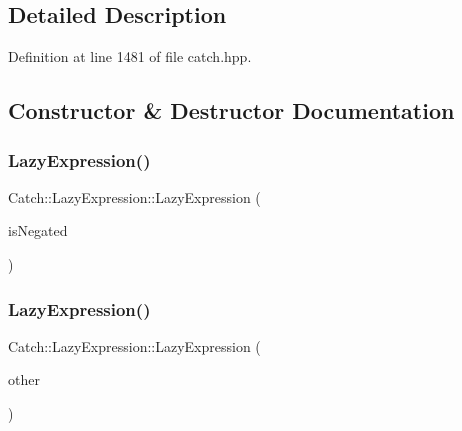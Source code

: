 \subsection{Detailed Description}


Definition at line 1481 of file catch.\+hpp.



\subsection{Constructor \& Destructor Documentation}
\mbox{\label{class_catch_1_1_lazy_expression_a47186c2487bd4bf871e870ba8048553a}} 
\subsubsection{\texorpdfstring{Lazy\+Expression()}{LazyExpression()}\hspace{0.1cm}{\footnotesize\ttfamily [1/2]}}
{\footnotesize\ttfamily Catch\+::\+Lazy\+Expression\+::\+Lazy\+Expression (\begin{DoxyParamCaption}\item[{bool}]{is\+Negated }\end{DoxyParamCaption})}

\mbox{\label{class_catch_1_1_lazy_expression_ab82d5e94df0e159b018fbde0170e46f8}} 
\subsubsection{\texorpdfstring{Lazy\+Expression()}{LazyExpression()}\hspace{0.1cm}{\footnotesize\ttfamily [2/2]}}
{\footnotesize\ttfamily Catch\+::\+Lazy\+Expression\+::\+Lazy\+Expression (\begin{DoxyParamCaption}\item[{\mbox{\hyperlink{class_catch_1_1_lazy_expression}{Lazy\+Expression}} const \&}]{other }\end{DoxyParamCaption})}



